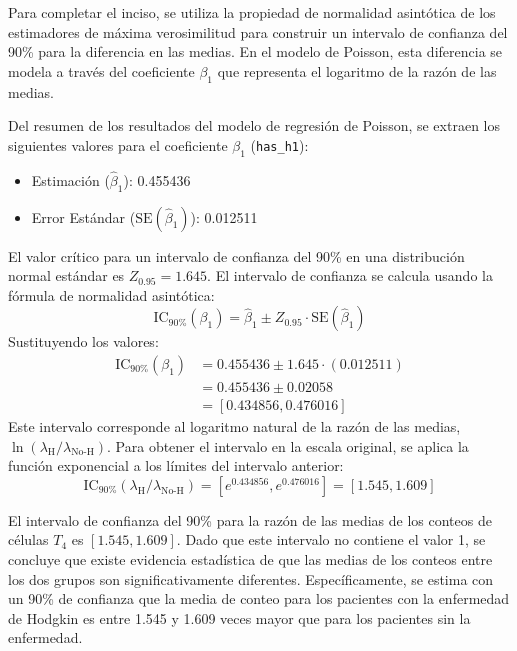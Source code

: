 \documentclass[paper=letter, fontsize=11pt, draft=false]{scrartcl}\usepackage[]{graphicx}\usepackage[]{xcolor}
\numberwithin{equation}{problemcounter} %
\numberwithin{figure}{problemcounter} %
\numberwithin{table}{problemcounter} %
\numberwithin{subsection}{problemcounter}
\begin{document}
Para completar el inciso, se utiliza la propiedad de normalidad asintótica de los estimadores de máxima verosimilitud para construir un intervalo de confianza del 90\% para la diferencia en las medias. En el modelo de Poisson, esta diferencia se modela a través del coeficiente $\beta_1$ que representa el logaritmo de la razón de las medias.

Del resumen de los resultados del modelo de regresión de Poisson, se extraen los siguientes valores para el coeficiente $\beta_1$ (\texttt{has\_h1}):
\begin{itemize}
    \item Estimación ($\hat{\beta}_1$): 0.455436
    \item Error Estándar ($\text{SE}(\hat{\beta}_1)$): 0.012511
\end{itemize}
El valor crítico para un intervalo de confianza del 90\% en una distribución normal estándar es $Z_{0.95} = 1.645$. El intervalo de confianza se calcula usando la fórmula de normalidad asintótica:
$$
\text{IC}_{90\%}(\beta_1) = \hat{\beta}_1 \pm Z_{0.95} \cdot \text{SE}(\hat{\beta}_1)
$$
Sustituyendo los valores:
\begin{align*}
\text{IC}_{90\%}(\beta_1) &= 0.455436 \pm 1.645 \cdot (0.012511) \\
&= 0.455436 \pm 0.02058 \\
&= [0.434856, 0.476016]
\end{align*}
Este intervalo corresponde al logaritmo natural de la razón de las medias, $\ln(\lambda_{\text{H}} / \lambda_{\text{No-H}})$. Para obtener el intervalo en la escala original, se aplica la función exponencial a los límites del intervalo anterior:
$$
\text{IC}_{90\%}(\lambda_\text{H} / \lambda_{\text{No-H}}) = [e^{0.434856}, e^{0.476016}] = [1.545, 1.609]
$$

El intervalo de confianza del 90\% para la razón de las medias de los conteos de células $T_4$ es $[1.545, 1.609]$. Dado que este intervalo no contiene el valor 1, se concluye que existe evidencia estadística de que las medias de los conteos entre los dos grupos son significativamente diferentes. Específicamente, se estima con un 90\% de confianza que la media de conteo para los pacientes con la enfermedad de Hodgkin es entre 1.545 y 1.609 veces mayor que para los pacientes sin la enfermedad.


\newpage
\end{document}
